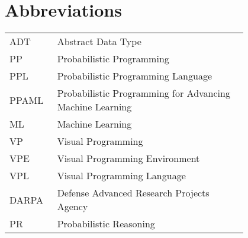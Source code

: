 \chapter*{Abbreviations}

\begin{flushleft}
\begin{tabular}{l p{0.8\linewidth}}
ADT      & Abstract Data Type\\
PP       & Probabilistic Programming\\
PPL      & Probabilistic Programming Language\\
PPAML    & Probabilistic Programming for Advancing Machine Learning\\
ML       & Machine Learning\\
VP       & Visual Programming\\
VPE      & Visual Programming Environment\\
VPL      & Visual Programming Language\\
DARPA    & Defense Advanced Research Projects Agency\\
PR       & Probabilistic Reasoning
\end{tabular}
\end{flushleft}
